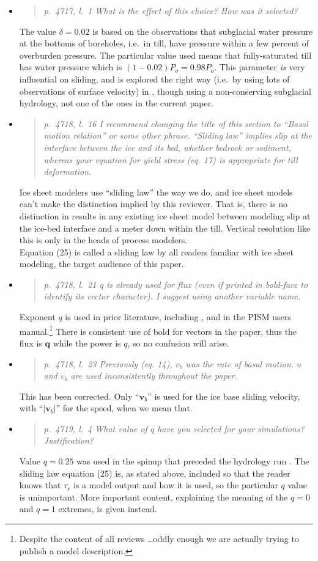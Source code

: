 \documentclass[11pt,reqno]{amsart}
\newcommand{\reply}[2]{
\medskip\medskip
\item  \begin{quote}
\emph{#1}
\end{quote}

\medskip
\noindent #2}
\begin{document}
\begin{itemize}
\reply{p.~4717, l.~1 What is the effect of this choice? How was it selected?}
{The value $\delta=0.02$ is based on the observations that subglacial water pressure at the bottoms of boreholes, i.e.~in till, have pressure within a few percent of overburden pressure.  The particular value used means that fully-saturated till has water pressure which is $(1-0.02)P_o=0.98 P_o$.  This parameter \emph{is} very influential on sliding, and is explored the right way (i.e.~by using lots of observations of surface velocity) in \cite{AschwandenAdalgeirsdottirKhroulev}, though using a non-conserving subglacial hydrology, not one of the ones in the current paper.}

\reply{p.~4718, l.~16 I recommend changing the title of this section to ``Basal motion relation'' or some other phrase. ``Sliding law'' implies slip at the interface between the ice and its bed, whether bedrock or sediment, whereas your equation for yield stress (eq. 17) is appropriate for till deformation.}
{Ice sheet modelers use ``sliding law'' the way we do, and ice sheet models can't make the distinction implied by this reviewer.  That is, there is no distinction in results in any existing ice sheet model between modeling slip at the ice-bed interface and a meter down within the till.  Vertical resolution like this is only in the heads of process modelers. \\
\indent Equation (25) is called a sliding law by all readers familiar with ice sheet modeling, the target audience of this paper.}

\reply{p.~4718, l.~21 q is already used for flux (even if printed in bold-face to identify its vector character).  I suggest using another variable name.}
{Exponent $q$ is used in prior literature, including \cite{AschwandenAdalgeirsdottirKhroulev}, and in the PISM users manual.\footnote{Despite the content of all reviews \dots oddly enough we are actually trying to publish a model description.}  There is consistent use of bold for vectors in the paper, thus the flux is $\mathbf{q}$ while the power is $q$, so no confusion will arise.}

\reply{p.~4718, l.~23 Previously (eq. 14), $v_b$ was the rate of basal motion. $u$ and $v_b$ are used inconsistently throughout the paper.}
{This has been corrected.  Only ``$\mathbf{v}_b$'' is used for the ice base sliding velocity, with ``$|\mathbf{v}_b|$'' for the speed, when we mean that.}

\reply{p.~4719, l.~4 What value of $q$ have you selected for your simulations? Justification?}
{Value $q=0.25$ was used in the spinup that preceded the hydrology run \cite{AschwandenAdalgeirsdottirKhroulev}.  The sliding law equation (25) is, as stated above, included so that the reader knows that $\tau_c$ is a model output and how it is used, so the particular $q$ value is unimportant.  More important content, explaining the meaning of the $q=0$ and $q=1$ extremes, is given instead.}


\end{itemize}
\end{document}

